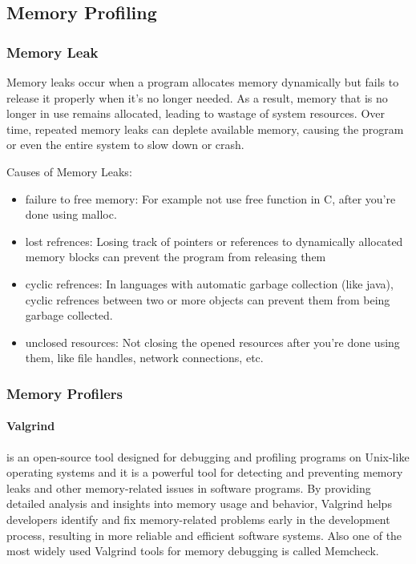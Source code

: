 \documentclass[12pt]{article}
\begin{document}
	\subsection{Memory Profiling}
	\subsubsection{Memory Leak}
	Memory leaks occur when a program allocates memory dynamically but fails to release it properly when it's no longer needed.
	As a result, memory that is no longer in use remains allocated, leading to wastage of system resources.
	Over time, repeated memory leaks can deplete available memory, causing the program or even the entire system to slow down or crash.
	
	Causes of Memory Leaks:
	\begin{itemize}
		\item failure to free memory: For example not use free function in C, after you're done using malloc.

		\item lost refrences: Losing track of pointers or references to dynamically allocated memory blocks can prevent the program from releasing them

		\item cyclic refrences: In languages with automatic garbage collection (like java), cyclic refrences between two or more objects can prevent them from being garbage collected.

		\item unclosed resources: Not closing the opened resources after you're done using them, like file handles, network connections, etc.
	\end{itemize}

	\subsubsection{Memory Profilers}
	\paragraph{Valgrind} is an open-source tool designed for debugging and profiling programs on Unix-like operating systems and it is a powerful tool for detecting and preventing memory leaks and other memory-related issues in software programs.
	By providing detailed analysis and insights into memory usage and behavior, Valgrind helps developers identify and fix memory-related problems early in the development process, resulting in more reliable and efficient software systems.
	Also one of the most widely used Valgrind tools for memory debugging is called Memcheck.
\end{document}
